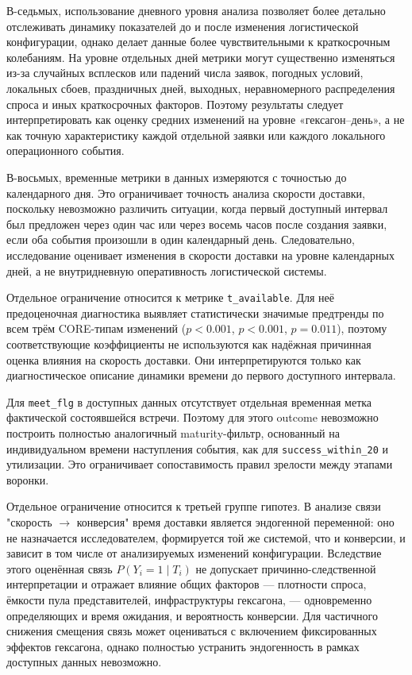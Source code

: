 \documentclass[14pt,a4paper]{extarticle}
\begin{document}
В-седьмых, использование дневного уровня анализа позволяет более детально отслеживать динамику показателей до и после изменения логистической конфигурации, однако делает данные более чувствительными к краткосрочным колебаниям. На уровне отдельных дней метрики могут существенно изменяться из-за случайных всплесков или падений числа заявок, погодных условий, локальных сбоев, праздничных дней, выходных, неравномерного распределения спроса и иных краткосрочных факторов. Поэтому результаты следует интерпретировать как оценку средних изменений на уровне «гексагон--день», а не как точную характеристику каждой отдельной заявки или каждого локального операционного события.

В-восьмых, временные метрики в данных измеряются с точностью до календарного дня. Это ограничивает точность анализа скорости доставки, поскольку невозможно различить ситуации, когда первый доступный интервал был предложен через один час или через восемь часов после создания заявки, если оба события произошли в один календарный день. Следовательно, исследование оценивает изменения в скорости доставки на уровне календарных дней, а не внутридневную оперативность логистической системы.

Отдельное ограничение относится к метрике \texttt{t\_available}. Для неё предоценочная диагностика выявляет статистически значимые предтренды по всем трём CORE-типам изменений (\(p<0.001\), \(p<0.001\), \(p=0.011\)), поэтому соответствующие коэффициенты не используются как надёжная причинная оценка влияния на скорость доставки. Они интерпретируются только как диагностическое описание динамики времени до первого доступного интервала.

Для \texttt{meet\_flg} в доступных данных отсутствует отдельная временная метка фактической состоявшейся встречи. Поэтому для этого outcome невозможно построить полностью аналогичный maturity-фильтр, основанный на индивидуальном времени наступления события, как для \texttt{success\_within\_20} и утилизации. Это ограничивает сопоставимость правил зрелости между этапами воронки.

Отдельное ограничение относится к третьей группе гипотез. В анализе связи "скорость $\rightarrow$ конверсия" время доставки является эндогенной переменной: оно не назначается исследователем, формируется той же системой, что и конверсии, и зависит в том числе от анализируемых изменений конфигурации. Вследствие этого оценённая связь $P(Y_i=1 \mid T_i)$ не допускает причинно-следственной интерпретации и отражает влияние общих факторов --- плотности спроса, ёмкости пула представителей, инфраструктуры гексагона, --- одновременно определяющих и время ожидания, и вероятность конверсии. Для частичного снижения смещения связь может оцениваться с включением фиксированных эффектов гексагона, однако полностью устранить эндогенность в рамках доступных данных невозможно.
\end{document}
